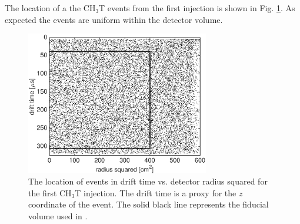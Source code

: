 The location of a the CH$_3$T events from the first injection is shown in Fig. \ref{fig:event_location}. As expected the events are uniform within the detector volume.
 
\begin{figure}[h!]\centering
\includegraphics[width=80mm]{fig/rz_scatter.eps}
\caption{The location of events in drift time vs. detector radius squared for the first CH$_3$T injection. The drift time is a proxy for the $z$ coordinate of the event. The solid black line represents the fiducial volume used in \cite{lux-prl}.}
\label{fig:event_location}
\end{figure}





